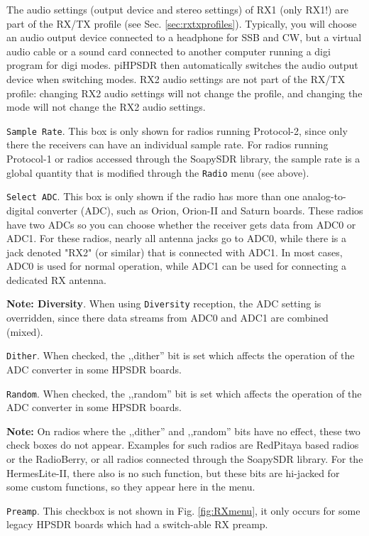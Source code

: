 \documentclass[12pt]{book}
\def\rett#1{\texttt{\color{red}#1}}
\def\bltt#1{\texttt{\color{blue}#1}}
\def\pH{pi\-HPSDR\xspace}
\begin{document}
The audio settings (output device and stereo settings) of RX1 (only RX1!) are part of the RX/TX profile (see Sec. \ref{sec:rxtxprofiles}). Typically, you will choose an audio output device connected to a headphone for
SSB and CW, but a virtual audio cable or a sound card connected to another computer running a digi program
for digi modes. \pH then automatically switches the audio output device when switching modes. RX2 audio
settings are not part of the RX/TX profile: changing RX2 audio settings will not change the profile,
and changing the mode will not change the RX2 audio settings.

\rett{Sample Rate}. This box is only shown for radios running Protocol-2, since only there the
receivers can have an individual sample rate. For radios running Protocol-1 or radios accessed
through the SoapySDR library, the sample rate is a global quantity that is modified
through the \bltt{Radio} menu (see above).

\rett{Select ADC}. This box is only shown if the radio has more than one analog-to-digital
converter (ADC), such as Orion, Orion-II and Saturn boards. These radios have two ADCs so
you can choose whether the receiver gets data from ADC0 or ADC1. For these radios, nearly
all antenna jacks go to ADC0, while there is a jack denoted "RX2" (or similar) that
is connected with ADC1. In most cases, ADC0 is used for normal operation, while ADC1
can be used for connecting a dedicated RX antenna.

\textbf{Note: Diversity}. When using \bltt{Diversity} reception, the ADC setting is
overridden, since there data streams from ADC0 and ADC1 are combined (mixed).

\rett{Dither}. When checked, the ,,dither'' bit is set which affects the operation of
the ADC converter in some HPSDR boards.

\rett{Random}. When checked, the ,,random'' bit is set which affects the operation of
the ADC converter in some HPSDR boards.

\textbf{Note:} On radios where the ,,dither'' and ,,random'' bits have no effect, these
two check boxes do not appear. Examples for such radios are RedPitaya based radios
or the RadioBerry, or all radios connected through the SoapySDR
library. For the HermesLite-II, there also is no such function, but these bits
are hi-jacked for some custom functions, so they appear here in the menu.

\rett{Preamp}. This checkbox is not shown in Fig. \ref{fig:RXmenu}, it only occurs
for some legacy HPSDR boards which had a switch-able RX preamp.
\end{document}
